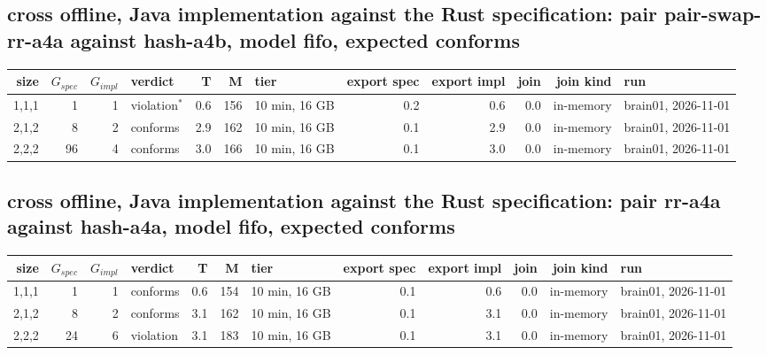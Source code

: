 \documentclass[10pt]{article}
\begin{document}
\subsection*{cross offline, Java implementation against the Rust specification: pair \textsf{pair-swap-rr-a4a} against \textsf{hash-a4b}, model fifo, expected conforms}
\begin{longtable}{@{}rrrlrrlrrrrl@{}}
\toprule
size & $G_{\mathit{spec}}$ & $G_{\mathit{impl}}$ & verdict & T & M & tier & export spec & export impl & join & join kind & run \\
\midrule
\endhead
\color{red} 1,1,1 & 1 & 1 & violation$^{\ast}$ & 0.6 & 156 & 10 min, 16 GB & 0.2 & 0.6 & 0.0 & in-memory & brain01, 2026-11-01 \\
\color{red} 2,1,2 & 8 & 2 & conforms & 2.9 & 162 & 10 min, 16 GB & 0.1 & 2.9 & 0.0 & in-memory & brain01, 2026-11-01 \\
\color{red} 2,2,2 & 96 & 4 & conforms & 3.0 & 166 & 10 min, 16 GB & 0.1 & 3.0 & 0.0 & in-memory & brain01, 2026-11-01 \\
\bottomrule
\end{longtable}
\subsection*{cross offline, Java implementation against the Rust specification: pair \textsf{rr-a4a} against \textsf{hash-a4a}, model fifo, expected conforms}
\begin{longtable}{@{}rrrlrrlrrrrl@{}}
\toprule
size & $G_{\mathit{spec}}$ & $G_{\mathit{impl}}$ & verdict & T & M & tier & export spec & export impl & join & join kind & run \\
\midrule
\endhead
\color{red} 1,1,1 & 1 & 1 & conforms & 0.6 & 154 & 10 min, 16 GB & 0.1 & 0.6 & 0.0 & in-memory & brain01, 2026-11-01 \\
\color{red} 2,1,2 & 8 & 2 & conforms & 3.1 & 162 & 10 min, 16 GB & 0.1 & 3.1 & 0.0 & in-memory & brain01, 2026-11-01 \\
\color{red} 2,2,2 & 24 & 6 & violation & 3.1 & 183 & 10 min, 16 GB & 0.1 & 3.1 & 0.0 & in-memory & brain01, 2026-11-01 \\
\bottomrule
\end{longtable}
\end{document}
